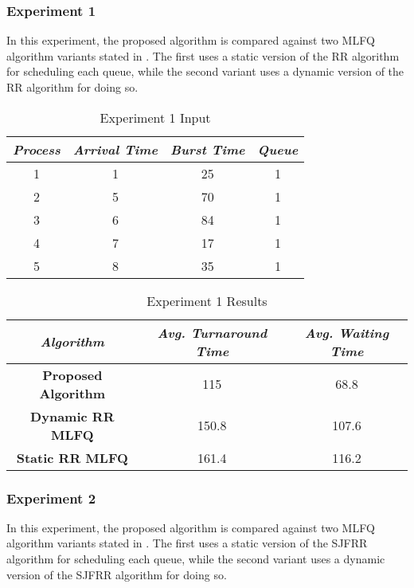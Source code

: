\documentclass[conference]{IEEEtran}
\newcommand\T{\rule{0pt}{2.6ex}}       %
\newcommand\B{\rule[-1.2ex]{0pt}{0pt}} %
\begin{document}
\subsubsection{Experiment 1}

In this experiment, the proposed algorithm is compared against two MLFQ algorithm variants stated in \cite{b4}. The first uses a static version of the RR algorithm for scheduling each queue, while the second variant uses a dynamic version of the RR algorithm for doing so.

\begin{table}[H]
    \caption{Experiment 1 Input}
    \centering
     \begin{tabular}{||c c c c||} 
     \hline
     \textit{\textbf{Process}} & \textit{\textbf{Arrival Time}} & \textit{\textbf{Burst Time}} & \textit{\textbf{Queue}} \T \B \\ 
     \hline
     \hline
     1 & 1 & 25 & 1 \T \B \\ 
     \hline
     2 & 5 & 70 & 1 \T \B \\
     \hline
     3 & 6 & 84 & 1 \T \B \\
     \hline
     4 & 7 & 17 & 1 \T \B \\
     \hline
     5 & 8 & 35 & 1 \T \B \\ 
     \hline
     \end{tabular}
\end{table}

\begin{table}[H]
    \caption{Experiment 1 Results}
    \centering
    \begin{tabular}{||c c c||}
        \hline
        \textit{\textbf{Algorithm}} & \textit{\textbf{Avg. Turnaround Time}} & \textit{\textbf{Avg. Waiting Time}}\T \B \\
    \hline
    \hline
    \textbf{Proposed Algorithm} & 115 & 68.8 \T \B\\ \hline
    \textbf{Dynamic RR MLFQ} & 150.8 & 107.6\T \B\\ \hline
    \textbf{Static RR MLFQ} & 161.4 & 116.2 \T \B\\ \hline
     \end{tabular}
\end{table}

\subsubsection{Experiment 2}

In this experiment, the proposed algorithm is compared against two MLFQ algorithm variants stated in \cite{b4}. The first uses a static version of the SJFRR algorithm for scheduling each queue, while the second variant uses a dynamic version of the SJFRR algorithm for doing so. 
\end{document}

